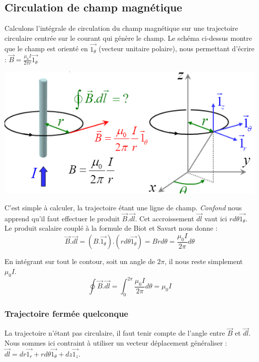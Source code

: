 \documentclass	[11pt, a4paper, openany]{book}
\begin{document}
\subsection{Circulation de champ magnétique}
Calculons l'intégrale de circulation du champ magnétique sur une trajectoire circulaire centrée sur le courant qui génère le champ. Le schéma ci-dessus montre  que le champ est orienté en $\vec{1_\theta}$ (vecteur unitaire polaire), nous permettant d'écrire : $\vec{B} = \frac{\mu_0 I}{2\pi r}\vec{1_\theta}$
\begin{center}
\includegraphics[scale=0.65]{magneto/image5.png}
\end{center}

C'est simple à calculer, la trajectoire étant une ligne de champ. \textit{Confond} nous apprend qu'il faut effectuer le produit $\vec{B}.\vec{dl}$. Cet accroissement $\vec{dl}$ vaut ici $rd\theta\vec{1_\theta}$. Le produit scalaire couplé à la formule de Biot et Savart nous donne :
\begin{equation}
\vec{B}.\vec{dl} = (B.\vec{1_\theta}).(rd\theta\vec{1_\theta}) = Brd\theta = \frac{\mu_0 I}{2\pi} d\theta
\end{equation}

En intégrant sur tout le contour, soit un angle de $2\pi$, il nous reste simplement $\mu_0 I$.
\begin{equation}
\oint \vec{B}.\vec{dl} = \int_0^{2\pi} \frac{\mu_0 I}{2\pi} d\theta = \mu_0 I
\end{equation}


\subsubsection*{Trajectoire fermée quelconque}
La trajectoire n'étant pas circulaire, il faut tenir compte de l'angle entre $\vec{B}$ et $\vec{dl}$. Nous sommes ici contraint à utiliser un vecteur déplacement généraliser : $\vec{dl} = dr \vec{1_r} + rd\theta \vec{1_\theta} + dz \vec{1_z}$. \\
\end{document}

